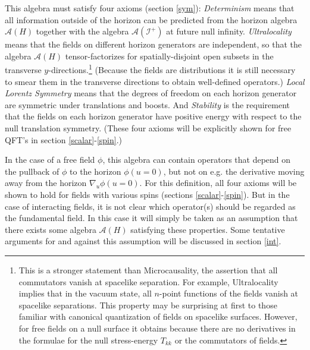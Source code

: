 \documentclass[12pt]{article}
\begin{document}
\begin{enumerate}
This algebra must satisfy four axioms (section \ref{sym}):  \textit{Determinism} means that all information outside of the horizon can be predicted from the horizon algebra $\mathcal{A}(H)$ together with the algebra $\mathcal{A}(\mathcal{I}^+)$ at future null infinity.  \textit{Ultralocality} means that the fields on different horizon generators are independent, so that the algebra $\mathcal{A}(H)$
tensor-factorizes for spatially-disjoint open subsets in the transverse $y$-directions.\footnote{This is a stronger statement than Microcausality, the assertion that all commutators vanish at spacelike separation.  For example, Ultralocality implies that in the vacuum state, all $n$-point functions of the fields vanish at spacelike separations.  This property may be surprising at first to those familiar with canonical quantization of fields on spacelike surfaces.  However, for free fields on a null surface it obtains because there are no derivatives in the formulae for the null stress-energy $T_{kk}$ or the commutators of fields.}  (Because the fields are distributions it is still necessary to smear them in the transverse directions to obtain well-defined operators.) \textit{Local Lorentz Symmetry} means that the degrees of freedom on each horizon generator are symmetric under translations and boosts.  And \textit{Stability} is the requirement that the fields on each horizon generator have positive energy with respect to the null translation symmetry.  (These four axioms will be explicitly shown for free QFT's in section \ref{scalar}-\ref{spin}.)

In the case of a free field $\phi$, this algebra can contain operators that depend on the pullback of $\phi$ to the horizon $\phi(u = 0)$, but not on e.g. the derivative moving away from the horizon $\nabla_u \phi(u = 0)$.  For this definition, all four axioms will be shown to hold for fields with various spins (sections \ref{scalar}-\ref{spin}).  But in the case of interacting fields, it is not clear which operator(s) should be regarded as the fundamental field.  In this case it will simply be taken as an assumption that there exists some algebra $\mathcal{A}(H)$ satisfying these properties.  Some tentative arguments for and against this assumption will be discussed in section \ref{int}.


\end{enumerate}
\end{document}
